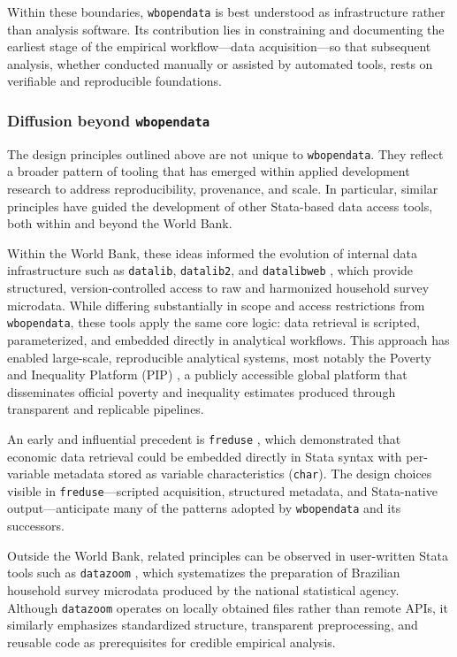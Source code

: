 \documentclass[bib]{statapress}
\begin{document}
Within these boundaries, \texttt{wbopendata} is best understood as infrastructure rather
than analysis software. Its contribution lies in constraining and documenting the earliest
stage of the empirical workflow---data acquisition---so that subsequent analysis, whether
conducted manually or assisted by automated tools, rests on verifiable and reproducible
foundations.

\subsubsection*{Diffusion beyond \texttt{wbopendata}}
The design principles outlined above are not unique to \texttt{wbopendata}. They
reflect a broader pattern of tooling that has emerged within applied development
research to address reproducibility, provenance, and scale. In particular, similar
principles have guided the development of other Stata-based data access tools,
both within and beyond the World Bank.

Within the World Bank, these ideas informed the evolution of internal data
infrastructure such as \texttt{datalib}, \texttt{datalib2}, and \texttt{datalibweb} \citep{datalibweb2018},
which provide structured, version-controlled access to raw and harmonized household survey
microdata. While differing substantially in scope and access restrictions from
\texttt{wbopendata}, these tools apply the same core logic: data retrieval is scripted,
parameterized, and embedded directly in analytical workflows. This approach has enabled large-scale, reproducible analytical systems, most notably
the Poverty and Inequality Platform (PIP) \citep{WorldBankPIP}, a publicly accessible
global platform that disseminates official poverty and inequality estimates produced
through transparent and replicable pipelines.

An early and influential precedent is \texttt{freduse} \citep{drukker2006freduse},
which demonstrated that economic data retrieval could be embedded directly in
Stata syntax with per-variable metadata stored as variable characteristics
(\texttt{char}). The design choices visible in \texttt{freduse}---scripted
acquisition, structured metadata, and Stata-native output---anticipate many of
the patterns adopted by \texttt{wbopendata} and its successors.

Outside the World Bank, related principles can be observed in user-written Stata
tools such as \texttt{datazoom} \citep{datazoom2020}, which systematizes the preparation of Brazilian
household survey microdata produced by the national statistical agency. Although
\texttt{datazoom} operates on locally obtained files rather than remote APIs, it
similarly emphasizes standardized structure, transparent preprocessing, and
reusable code as prerequisites for credible empirical analysis.
\end{document}
